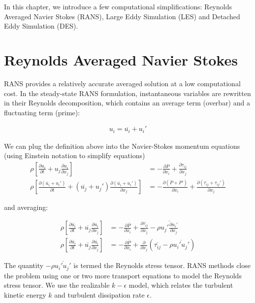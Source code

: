 \documentclass[book.tex]{subfiles}
\begin{document}
In this chapter, we introduce a few computational simplifications: Reynolds Averaged Navier Stokes (RANS), Large Eddy Simulation (LES) and Detached Eddy Simulation (DES).\cite{norrby_2014,cfd-online,shaughnessy} 

\section{Reynolds Averaged Navier Stokes}

RANS provides a relatively accurate averaged solution at a low computational cost. In the steady-state RANS formulation, instantaneous variables are rewritten in their Reynolds decomposition, which contains an average term (overbar) and a fluctuating term (prime): 

\begin{align}u_i = \overline{u_i} + u_i'\end{align}

We can plug the definition above into the Navier-Stokes momentum equations (using Einstein notation to simplify equations) %
\begin{align}
\rho\left[\frac{\partial u_i}{\partial t}+u_j\frac{\partial u_i}{\partial x_j}\right]&= -\frac{\partial P}{\partial x_i} +\frac{\partial \tau_{ij}}{\partial x_j}\\
\rho\left[\frac{\partial (\overline{u_i} + u_i')}{\partial t}+(\overline{u_j} + u_j')\frac{\partial (\overline{u_i} + u_i')}{\partial x_j}\right]&= -\frac{\partial (\overline{P} + P')}{\partial x_i} +\frac{\partial (\overline{\tau_{ij}} + \tau_{ij}')}{\partial x_j}
\end{align}


and averaging:

\begin{align}
\rho\left[\frac{\partial \overline{u_i}}{\partial t}+\overline{u_j}\frac{\partial \overline{u_i}}{\partial x_j}\right]&= -\frac{\partial \overline{P}}{\partial x_i} +\frac{\partial \overline{\tau_{ij}}}{\partial x_j}-\rho\overline{u_j'\frac{\partial u_i'}{\partial x_j}}\\
\rho\left[\frac{\partial \overline{u_i}}{\partial t}+\overline{u_j}\frac{\partial \overline{u_i}}{\partial x_j}\right]&= -\frac{\partial \overline{P}}{\partial x_i} +\frac{\partial}{\partial x_j}\left(\overline{\tau_{ij}}-\rho\overline{u_i'u_j'}\right)
\end{align}


The quantity $-\rho\overline{u_i'u_j'}$ is termed the Reynolds stress tensor. RANS methods close the problem using one or two more transport equations to model the Reynolds stress tensor. 
We use the realizable $k-\epsilon$ model, which relates the turbulent kinetic energy $k$ and turbulent dissipation rate $\epsilon$. 
\end{document}

